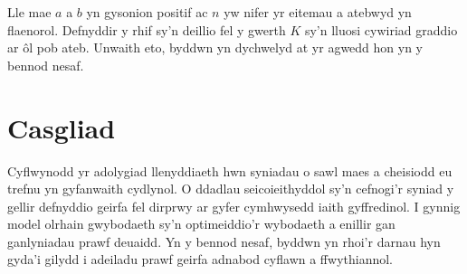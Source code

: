 Lle mae $a$ a $b$ yn gysonion positif ac $n$ yw nifer yr eitemau a atebwyd yn flaenorol. Defnyddir y rhif sy'n deillio fel y gwerth $K$ sy'n lluosi cywiriad graddio ar ôl pob ateb. Unwaith eto, byddwn yn dychwelyd at yr agwedd hon yn y bennod nesaf.

\section{Casgliad}
Cyflwynodd yr adolygiad llenyddiaeth hwn syniadau o sawl maes a cheisiodd eu trefnu yn gyfanwaith cydlynol. O ddadlau seicoieithyddol sy'n cefnogi'r syniad y gellir defnyddio geirfa fel dirprwy ar gyfer cymhwysedd iaith gyffredinol. I gynnig model olrhain gwybodaeth sy'n optimeiddio'r wybodaeth a enillir gan ganlyniadau prawf deuaidd. Yn y bennod nesaf, byddwn yn rhoi'r darnau hyn gyda'i gilydd i adeiladu prawf geirfa adnabod cyflawn a ffwythiannol.